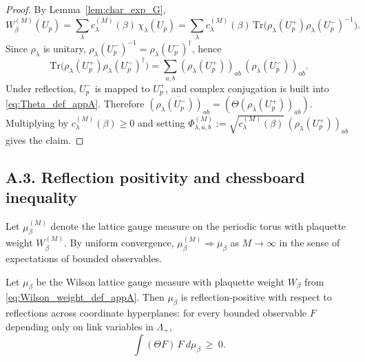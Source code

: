 \begin{proof}
By Lemma~\ref{lem:char_exp_G},
\[
W_{\beta}^{(M)}(U_p)=\sum_{\lambda} c^{(M)}_{\lambda}(\beta)\,\chi_\lambda(U_p)
=\sum_{\lambda} c^{(M)}_{\lambda}(\beta)\,\mathrm{Tr}\big(\rho_\lambda(U_p^+)\rho_\lambda(U_p^-)^{-1}\big).
\]
Since $\rho_\lambda$ is unitary, $\rho_\lambda(U_p^-)^{-1}=\rho_\lambda(U_p^-)^{\dagger}$, hence
\[
\mathrm{Tr}\big(\rho_\lambda(U_p^+)\rho_\lambda(U_p^-)^{\dagger}\big)
=\sum_{a,b} (\rho_\lambda(U_p^+))_{ab}\,\overline{(\rho_\lambda(U_p^-))_{ab}}.
\]
Under reflection, $U_p^-$ is mapped to $U_p^+$, and complex conjugation is built into \eqref{eq:Theta_def_appA}.
Therefore $\overline{(\rho_\lambda(U_p^-))_{ab}}=(\Theta (\rho_\lambda(U_p^+))_{ab})$.
Multiplying by $c^{(M)}_{\lambda}(\beta)\ge 0$ and setting
$\Phi^{(M)}_{\lambda,a,b}:=\sqrt{c^{(M)}_{\lambda}(\beta)}\,(\rho_\lambda(U_p^+))_{ab}$ gives the claim.
\end{proof}

\subsection*{A.3. Reflection positivity and chessboard inequality}

Let $\mu_{\beta}^{(M)}$ denote the lattice gauge measure on the periodic torus with plaquette weight $W_{\beta}^{(M)}$.
By uniform convergence, $\mu_{\beta}^{(M)}\Rightarrow \mu_{\beta}$ as $M\to\infty$ in the sense of expectations of bounded observables.

\begin{theorem}\label{thm:reflection_pos}\label{thm:RP_Wilson_full}
Let $\mu_\beta$ be the Wilson lattice gauge measure with plaquette weight $W_\beta$ from \eqref{eq:Wilson_weight_def_appA}.
Then $\mu_\beta$ is reflection-positive with respect to reflections across coordinate hyperplanes:
for every bounded observable $F$ depending only on link variables in $\Lambda_+$,
\begin{equation}\label{eq:RP_quadratic_form}
\int (\Theta F)\,F\ d\mu_\beta\ \ge\ 0.
\end{equation}
\end{theorem}


